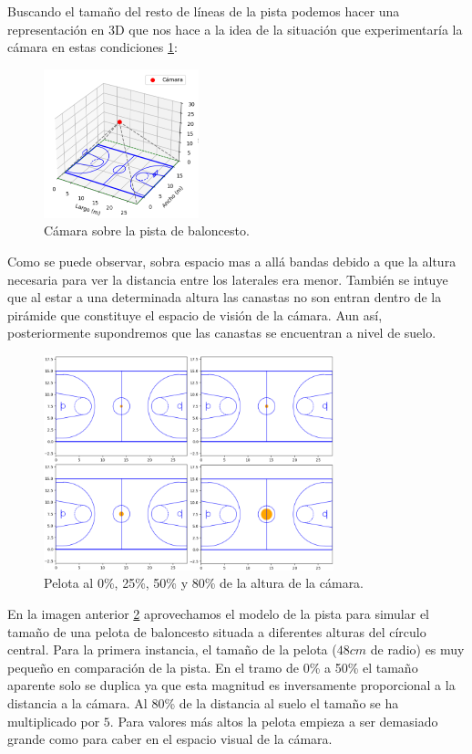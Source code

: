 \documentclass[12pt]{article}
\begin{document}
Buscando el tamaño del resto de líneas de la pista podemos hacer una representación en 3D que nos hace a la idea de la situación que experimentaría la cámara en estas condiciones \ref{fig:pista_basket}:
\begin{figure}[H]
    \centering
    \includegraphics[width=0.4\textwidth]{images_calibracion/Pista_basket.png}
    \caption{Cámara sobre la pista de baloncesto.}
    \label{fig:pista_basket}
\end{figure}
Como se puede observar, sobra espacio mas a allá bandas debido a que la altura necesaria para ver la distancia entre los laterales era menor. 
También se intuye que al estar a una determinada altura las canastas no son entran dentro de la pirámide que constituye el espacio de visión de la cámara.
Aun así, posteriormente supondremos que las canastas se encuentran a nivel de suelo.

\begin{figure}[H]
    \centering
    \includegraphics[width=0.75\textwidth]{images_calibracion/Pelota.png}  
    \caption{Pelota al 0\%, 25\%, 50\% y 80\% de la altura de la cámara.}
    \label{fig:pelota}
\end{figure}

En la imagen anterior \ref{fig:pelota} aprovechamos el modelo de la pista para simular el tamaño de una pelota de baloncesto situada a diferentes alturas del círculo central.
Para la primera instancia, el tamaño de la pelota ($48 cm$ de radio) es muy pequeño en comparación de la pista. En el tramo de 0\% a 50\% el tamaño aparente solo se duplica ya que esta magnitud es inversamente proporcional a la distancia a la cámara.
Al 80\% de la distancia al suelo el tamaño se ha multiplicado por $5$. Para valores más altos la pelota empieza a ser demasiado grande como para caber en el espacio visual de la cámara.
\end{document}
